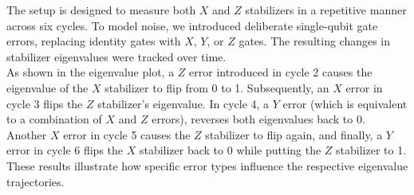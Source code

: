 \documentclass[9pt,a4paper,twocolumn,twoside]{tau-class/tau}
\begin{document}
The setup is designed to measure both \(X\) and \(Z\) stabilizers in a repetitive manner across six cycles. To model noise, we introduced deliberate single-qubit gate errors, replacing identity gates with \(X\), \(Y\), or \(Z\) gates. The resulting changes in stabilizer eigenvalues were tracked over time. \\
As shown in the eigenvalue plot, a \(Z\) error introduced in cycle 2 causes the eigenvalue of the \(X\) stabilizer to flip from 0 to 1. Subsequently, an \(X\) error in cycle 3 flips the \(Z\) stabilizer’s eigenvalue. In cycle 4, a \(Y\) error (which is equivalent to a combination of \(X\) and \(Z\) errors), reverses both eigenvalues back to 0. Another \(X\) error in cycle 5 causes the \(Z\) stabilizer to flip again, and finally, a \(Y\) error in cycle 6 flips the \(X\) stabilizer back to 0 while putting the \(Z\) stabilizer to 1. These results illustrate how specific error types influence the respective eigenvalue trajectories.
\end{document}
